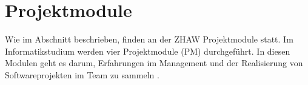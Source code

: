 



\section{Projektmodule}
\label{sec:Projektmodule} 
Wie im Abschnitt  beschrieben, finden an der ZHAW Projektmodule statt. Im  Informatikstudium werden vier Projektmodule (PM) durchgeführt. In diesen Modulen geht es darum, Erfahrungen im Management und der Realisierung von Softwareprojekten im Team zu sammeln \parencite{noauthor_modul_nodate}. 

